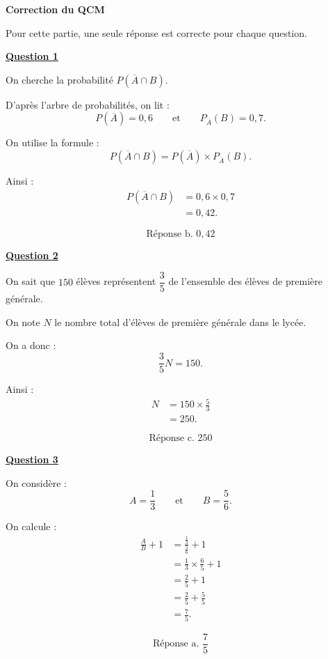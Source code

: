 \textbf{Correction du QCM}
			
			\medskip
			Pour cette partie, une seule réponse est correcte pour chaque question.
			
			\medskip
			\textbf{\underline{Question 1}}
			
			\medskip
			On cherche la probabilité $P(\overline{A}\cap B)$.
			
			D'après l'arbre de probabilités, on lit :
			\[
			P(\overline{A})=0{,}6
			\qquad\text{et}\qquad
			P_{\overline{A}}(B)=0{,}7.
			\]
			
			On utilise la formule :
			\[
			P(\overline{A}\cap B)=P(\overline{A})\times P_{\overline{A}}(B).
			\]
			
			Ainsi :
			\begin{align*}
				P(\overline{A}\cap B)&=0{,}6\times 0{,}7\\
				&=0{,}42.
			\end{align*}
			
			\[
			\boxed{\text{Réponse b. }0{,}42}
			\]
			
			\medskip
			\textbf{\underline{Question 2}}
			
			\medskip
			On sait que $150$ élèves représentent $\dfrac35$ de l'ensemble des élèves de première générale.
			
			On note $N$ le nombre total d'élèves de première générale dans le lycée.
			
			On a donc :
			\[
			\frac35 N=150.
			\]
			
			Ainsi :
			\begin{align*}
				N&=150\times \frac53\\
				&=250.
			\end{align*}
			
			\[
			\boxed{\text{Réponse c. }250}
			\]
			
			\medskip
			\textbf{\underline{Question 3}}
			
			\medskip
			On considère :
			\[
			A=\frac13
			\qquad\text{et}\qquad
			B=\frac56.
			\]
			
			On calcule :
			\begin{align*}
				\frac{A}{B}+1
				&=\frac{\frac13}{\frac56}+1\\
				&=\frac13\times \frac65+1\\
				&=\frac25+1\\
				&=\frac25+\frac55\\
				&=\frac75.
			\end{align*}
			
			\[
			\boxed{\text{Réponse a. }\dfrac75}
			\]
			

